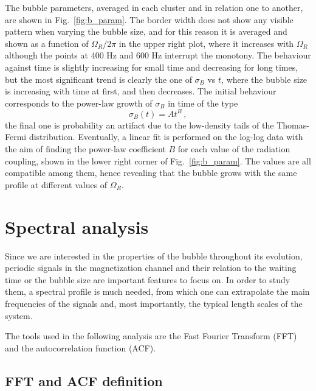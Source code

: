 The bubble parameters, averaged in each cluster and in relation one to another, are shown in Fig.\ \ref{fig:b_param}. The border width does not show any visible pattern when varying the bubble size, and for this reason it is averaged and shown as a function of $\Omega_R/2\pi$ in the upper right plot, where it increases with $\Omega_R$ although the points at 400 Hz and 600 Hz interrupt the monotony. The behaviour against time is slightly increasing for small time and decreasing for long times, but the most significant trend is clearly the one of $\sigma_B$ vs $t$, where the bubble size is increasing with time at first, and then decreases. The initial behaviour corresponds to the power-law growth of $\sigma_B$ in time of the type
\[
    \sigma_B(t) = At^B\, , 
\]
the final one is probability an artifact due to the low-density tails of the Thomas-Fermi distribution. Eventually, a linear fit is performed on the log-log data with the aim of finding the power-law coefficient $B$ for each value of the radiation coupling, shown in the lower right corner of Fig.\ \ref{fig:b_param}. The values are all compatible among them, hence revealing that the bubble grows with the same profile at different values of $\Omega_R$.

\section{Spectral analysis}
Since we are interested in the properties of the bubble throughout its evolution, periodic signals in the magnetization channel and their relation to the waiting time or the bubble size are important features to focus on. In order to study them, a spectral profile is much needed, from which one can extrapolate the main frequencies of the signals and, most importantly, the typical length scales of the system.

The tools used in the following analysis are the Fast Fourier Transform (FFT) and the autocorrelation function (ACF).

\subsection{FFT and ACF definition}
